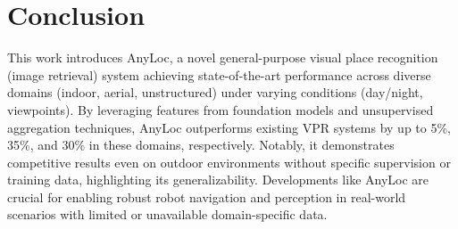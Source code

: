 \section{Conclusion}

This work introduces AnyLoc, a novel general-purpose visual place
recognition (image retrieval) system achieving state-of-the-art
performance across diverse domains (indoor, aerial, unstructured)
under varying conditions (day/night, viewpoints). By leveraging
features from foundation models and unsupervised aggregation
techniques, AnyLoc outperforms existing VPR systems by up to 5\%, 35\%,
and 30\% in these domains, respectively. Notably, it demonstrates
competitive results even on outdoor environments without specific
supervision or training data, highlighting its generalizability.
Developments like AnyLoc are crucial for enabling robust robot
navigation and perception in real-world scenarios with limited or
unavailable domain-specific data.
